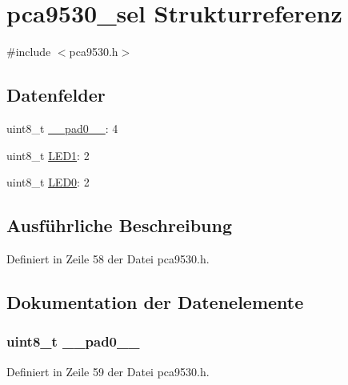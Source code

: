 \hypertarget{structpca9530__sel}{}\section{pca9530\+\_\+sel Strukturreferenz}
\label{structpca9530__sel}


{\ttfamily \#include $<$pca9530.\+h$>$}

\subsection*{Datenfelder}
\begin{DoxyCompactItemize}
\item 
uint8\+\_\+t \hyperlink{structpca9530__sel_a8b4eebe79ded0459acec2f4950102ba3}{\+\_\+\+\_\+pad0\+\_\+\+\_\+}\+: 4
\item 
uint8\+\_\+t \hyperlink{structpca9530__sel_a40e423e01a324e06ebc015b85a9d6b8e}{L\+E\+D1}\+: 2
\item 
uint8\+\_\+t \hyperlink{structpca9530__sel_a698763138aab81826861fd602c87872b}{L\+E\+D0}\+: 2
\end{DoxyCompactItemize}


\subsection{Ausführliche Beschreibung}


Definiert in Zeile 58 der Datei pca9530.\+h.



\subsection{Dokumentation der Datenelemente}
\hypertarget{structpca9530__sel_a8b4eebe79ded0459acec2f4950102ba3}{}
\subsubsection[{\+\_\+\+\_\+pad0\+\_\+\+\_\+}]{\setlength{\rightskip}{0pt plus 5cm}uint8\+\_\+t \+\_\+\+\_\+pad0\+\_\+\+\_\+}\label{structpca9530__sel_a8b4eebe79ded0459acec2f4950102ba3}


Definiert in Zeile 59 der Datei pca9530.\+h.

\hypertarget{structpca9530__sel_a698763138aab81826861fd602c87872b}{}
